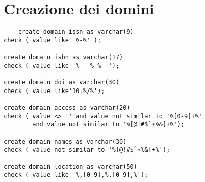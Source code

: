 \section{Creazione dei domini}
\begin{lstlisting}
	create domain issn as varchar(9)
check ( value like '%-%' );

create domain isbn as varchar(17)
check ( value like '%-_-%-%-_');

create domain doi as varchar(30)
check ( value like'10.%/%');

create domain access as varchar(20)
check ( value <> '' and value not similar to '%[0-9]+%'
        and value not similar to '%[@!#$ˆ∗%&]+%');

create domain names as varchar(30)
check ( value not similar to '%[@!#$ˆ∗%&]+%');

create domain location as varchar(50)
check ( value like '%,[0-9],%,[0-9],%');
\end{lstlisting}




